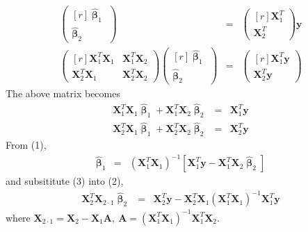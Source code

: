 \documentclass[12pt]{article} %
\begin{document}
\begin{enumerate}
\begin{enumerate}
\begin{eqnarray*}
\begin{pmatrix}[r]
 	  	 \hat{\pmb{\upbeta}}_{1} \\
 	  	 \hat{\pmb{\upbeta}}_{2}
 	  	\end{pmatrix}
 	  	&=&
 	  	\begin{pmatrix}[r]
  	  	 \mathbf{X}_{1}^{T} \\
 	  	 \mathbf{X}_{2}^{T}	  	 
 	  	\end{pmatrix}\mathbf{y}\\
 	  	\begin{pmatrix}[r]
 	  	 \mathbf{X}_{1}^{T}\mathbf{X}_{1} & \mathbf{X}_{1}^{T}\mathbf{X}_{2} \\
 	  	 \mathbf{X}_{2}^{T}\mathbf{X}_{1} & \mathbf{X}_{2}^{T}\mathbf{X}_{2}
 	  	\end{pmatrix}
 	  	\begin{pmatrix}[r]
 	  	 \hat{\pmb{\upbeta}}_{1} \\
 	  	 \hat{\pmb{\upbeta}}_{2}
 	  	\end{pmatrix} 	  	
 	  	&=&
 	  	\begin{pmatrix}[r]
 	  	 \mathbf{X}_{1}^{T}\mathbf{y} \\
 	  	 \mathbf{X}_{2}^{T}\mathbf{y}
 	  	\end{pmatrix}
 	  \end{eqnarray*}
 	   The above matrix becomes 	  
 	  \begin{eqnarray}
 	  	\mathbf{X}_{1}^{T}\mathbf{X}_{1}\hat{\pmb{\upbeta}}_{1}
 	  	+\mathbf{X}_{1}^{T}\mathbf{X}_{2}\hat{\pmb{\upbeta}}_{2}&=&
 	  	\mathbf{X}_{1}^{T}\mathbf{y}\\
 	  	\mathbf{X}_{2}^{T}\mathbf{X}_{1}\hat{\pmb{\upbeta}}_{1}
 	  	+\mathbf{X}_{2}^{T}\mathbf{X}_{2}\hat{\pmb{\upbeta}}_{2}&=&
 	  	\mathbf{X}_{2}^{T}\mathbf{y}
 	  \end{eqnarray}
 	  From (1), 
 	  \begin{eqnarray}
 	   \hat{\pmb{\upbeta}}_{1}&=&
 	   (\mathbf{X}_{1}^{T}\mathbf{X}_{1})^{-1}
 	   [\mathbf{X}_{1}^{T}\mathbf{y}-\mathbf{X}_{1}^{T}\mathbf{X}_{2}\hat{\pmb{\upbeta}}_{2}] 	   
 	  \end{eqnarray}
 	  and subsititute (3) into (2),
 	  \begin{eqnarray}
 	   \mathbf{X}_{2}^{T}\mathbf{X}_{2\cdot 1}\hat{\pmb{\upbeta}}_{2}&=&
 	   \mathbf{X}_{2}^{T}\mathbf{y}-\mathbf{X}_{2}^{T}\mathbf{X}_{1}
 	   (\mathbf{X}_{1}^{T}\mathbf{X}_{1})^{-1}\mathbf{X}_{1}^{T}\mathbf{y}
 	  \end{eqnarray}
 	  where $\mathbf{X}_{2\cdot
 	  1}=\mathbf{X}_{2}-\mathbf{X}_{1}\mathbf{A},~\mathbf{A}=
 	  (\mathbf{X}_{1}^{T}\mathbf{X}_{1})^{-1}\mathbf{X}_{1}^{T}\mathbf{X}_{2}$.

\end{enumerate}
\end{enumerate}
\end{document}
